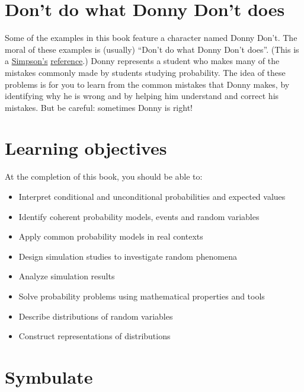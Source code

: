 \documentclass[
  letterpaper,
  DIV=11,
  numbers=noendperiod]{scrreprt}
\providecommand{\tightlist}{%
  \setlength{\itemsep}{0pt}\setlength{\parskip}{0pt}}
\theoremstyle{plain}
\theoremstyle{definition}
\theoremstyle{definition}
\theoremstyle{definition}
\theoremstyle{remark}
\begin{document}
\section*{Don't do what Donny Don't
does}\label{dont-do-what-donny-dont-does}


Some of the examples in this book feature a character named Donny Don't.
The moral of these examples is (usually) ``Don't do what Donny Don't
does''. (This is a
\href{https://frinkiac.com/video/S05E08/0nvMY69o6o_U7BqeIzQ314al-SQ=.gif}{Simpson's}
\href{https://simpsons.fandom.com/wiki/Boy-Scoutz_\%27n_the_Hood}{reference}.)
Donny represents a student who makes many of the mistakes commonly made
by students studying probability. The idea of these problems is for you
to learn from the common mistakes that Donny makes, by identifying why
he is wrong and by helping him understand and correct his mistakes. But
be careful: sometimes Donny is right!

\section*{Learning objectives}\label{learning-objectives}


At the completion of this book, you should be able to:

\begin{itemize}
\tightlist
\item
  Interpret conditional and unconditional probabilities and expected
  values
\item
  Identify coherent probability models, events and random variables
\item
  Apply common probability models in real contexts
\item
  Design simulation studies to investigate random phenomena
\item
  Analyze simulation results
\item
  Solve probability problems using mathematical properties and tools
\item
  Describe distributions of random variables
\item
  Construct representations of distributions
\end{itemize}

\section*{Symbulate}\label{symbulate}
\end{document}
